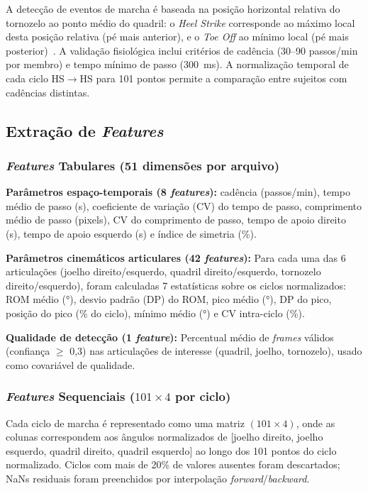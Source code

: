 \documentclass[a4paper,12pt]{article}
\begin{document}
A detecção de eventos de marcha é baseada na posição horizontal relativa do
tornozelo ao ponto médio do quadril: o \textit{Heel Strike} corresponde ao máximo
local desta posição relativa (pé mais anterior), e o \textit{Toe Off} ao mínimo
local (pé mais posterior)~\cite{Stenum2021}. A validação fisiológica inclui
critérios de cadência (30--90 passos/min por membro) e tempo mínimo de passo
(300~ms). A normalização temporal de cada ciclo HS$\rightarrow$HS para 101 pontos
permite a comparação entre sujeitos com cadências distintas.

\subsection{Extração de \textit{Features}}

\subsubsection{\textit{Features} Tabulares (51 dimensões por arquivo)}

\textbf{Parâmetros espaço-temporais (8 \textit{features}):}
cadência (passos/min), tempo médio de passo (s), coeficiente de variação (CV) do
tempo de passo, comprimento médio de passo (pixels), CV do comprimento de passo,
tempo de apoio direito (s), tempo de apoio esquerdo (s) e índice de simetria (\%).

\textbf{Parâmetros cinemáticos articulares (42 \textit{features}):}
Para cada uma das 6 articulações (joelho direito/esquerdo, quadril direito/esquerdo,
tornozelo direito/esquerdo), foram calculadas 7 estatísticas sobre os ciclos
normalizados: ROM médio (°), desvio padrão (DP) do ROM, pico médio (°), DP do pico,
posição do pico (\% do ciclo), mínimo médio (°) e CV intra-ciclo (\%).

\textbf{Qualidade de detecção (1 \textit{feature}):}
Percentual médio de \textit{frames} válidos (confiança $\geq$ 0,3) nas articulações
de interesse (quadril, joelho, tornozelo), usado como covariável de qualidade.

\subsubsection{\textit{Features} Sequenciais ($101 \times 4$ por ciclo)}

Cada ciclo de marcha é representado como uma matriz $(101 \times 4)$, onde as colunas
correspondem aos ângulos normalizados de [joelho direito, joelho esquerdo, quadril
direito, quadril esquerdo] ao longo dos 101 pontos do ciclo normalizado. Ciclos com
mais de 20\% de valores ausentes foram descartados; NaNs residuais foram preenchidos
por interpolação \textit{forward}/\textit{backward}.
\end{document}

